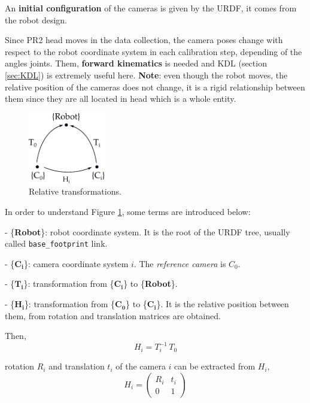 An \textbf{initial configuration} of the cameras is given by the URDF, it comes from the robot design.

Since PR2 head moves in the data collection, the camera poses change with respect to the robot coordinate system in each calibration step, depending of the angles joints. Them, \textbf{forward kinematics} is needed and KDL (section \ref{sec:KDL}) is extremely useful here.
\textbf{Note}: even though the robot moves, the relative position of the cameras does not change, it is a rigid relationship between them since they are all located in head which is a whole entity.

\begin{figure}[!htbp]
 \centering
 \includegraphics[width=0.3\textwidth]{images/initialization.pdf}
 \caption{Relative transformations.}
 \label{fig:initialization}
\end{figure}

\noindent
In order to understand Figure \ref{fig:initialization}, some terms are introduced below:
\begin{itemize*}
 \item[-] \{\textbf{Robot}\}: robot coordinate system. It is the root of the URDF tree, usually called \texttt{base\_footprint} link.

 \item[-]  \{$\mathbf{C_i}$\}: camera coordinate system $i$. The \textit{reference camera} is $C_0$.

 \item[-]  \{$\mathbf{T_i}$\}: transformation from  \{$\mathbf{C_i}$\} to \{\textbf{Robot}\}.

 \item[-] \{$\mathbf{H_i}$\}: transformation from  \{$\mathbf{C_0}$\} to  \{$\mathbf{C_i}$\}. It is the relative position between them, from rotation and translation matrices are obtained.
\end{itemize*}

Then,
\begin{equation}
 H_i = T_i^{-1} \, T_0
\end{equation}

rotation $R_i$ and translation $t_i$ of the camera $i$ can be extracted from $H_i$,
\begin{equation}
 H_i = \begin{pmatrix}
        R_i & t_i \\
        0   & 1
        \end{pmatrix}
\end{equation}

